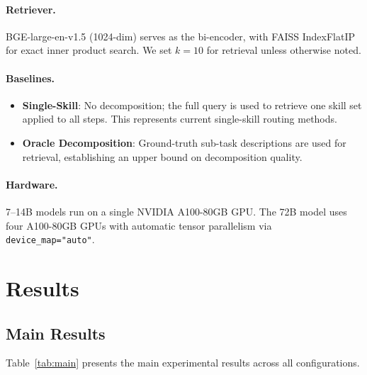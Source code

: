 \documentclass[11pt]{article}
\begin{document}
\paragraph{Retriever.}
BGE-large-en-v1.5 \cite{xiao2023bge} (1024-dim) serves as the bi-encoder, with FAISS IndexFlatIP for exact inner product search.
We set $k=10$ for retrieval unless otherwise noted.

\paragraph{Baselines.}
\begin{itemize}[nosep,leftmargin=*]
  \item \textbf{Single-Skill}: No decomposition; the full query is used to retrieve one skill set applied to all steps. This represents current single-skill routing methods.
  \item \textbf{Oracle Decomposition}: Ground-truth sub-task descriptions are used for retrieval, establishing an upper bound on decomposition quality.
\end{itemize}

\paragraph{Hardware.} 
7--14B models run on a single NVIDIA A100-80GB GPU.
The 72B model uses four A100-80GB GPUs with automatic tensor parallelism via \texttt{device\_map="auto"}.

\section{Results}
\label{sec:results}

\subsection{Main Results}

Table~\ref{tab:main} presents the main experimental results across all configurations.
\end{document}
